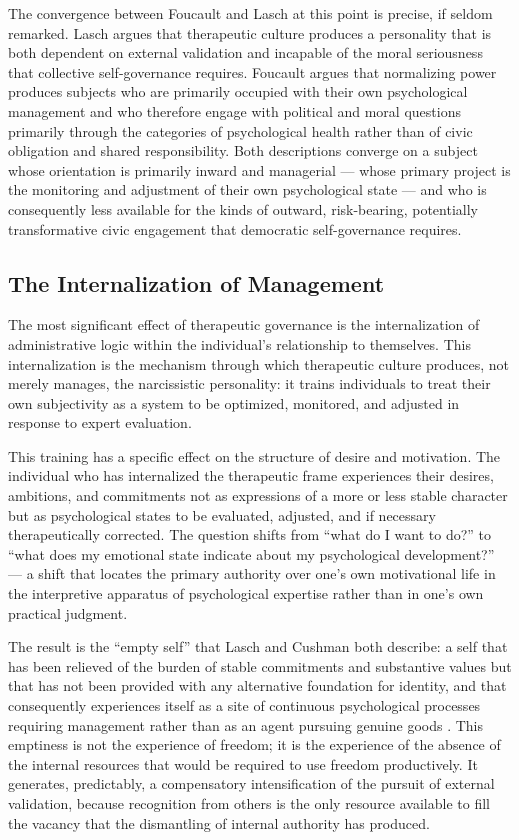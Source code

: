 \documentclass[12pt]{memoir}
\begin{document}
The convergence between Foucault and Lasch at this point is precise, if seldom
remarked. Lasch argues that therapeutic culture produces a personality that is both
dependent on external validation and incapable of the moral seriousness that
collective self-governance requires. Foucault argues that normalizing power produces
subjects who are primarily occupied with their own psychological management and who
therefore engage with political and moral questions primarily through the categories
of psychological health rather than of civic obligation and shared responsibility.
Both descriptions converge on a subject whose orientation is primarily inward and
managerial — whose primary project is the monitoring and adjustment of their own
psychological state — and who is consequently less available for the kinds of
outward, risk-bearing, potentially transformative civic engagement that democratic
self-governance requires.

\subsection{The Internalization of Management}

The most significant effect of therapeutic governance is the internalization of
administrative logic within the individual's relationship to themselves. This
internalization is the mechanism through which therapeutic culture produces, not
merely manages, the narcissistic personality: it trains individuals to treat their
own subjectivity as a system to be optimized, monitored, and adjusted in response
to expert evaluation.

This training has a specific effect on the structure of desire and motivation. The
individual who has internalized the therapeutic frame experiences their desires,
ambitions, and commitments not as expressions of a more or less stable character
but as psychological states to be evaluated, adjusted, and if necessary therapeutically
corrected. The question shifts from \enquote{what do I want to do?} to \enquote{what
does my emotional state indicate about my psychological development?} — a shift that
locates the primary authority over one's own motivational life in the interpretive
apparatus of psychological expertise rather than in one's own practical judgment.

The result is the \enquote{empty self} that Lasch and Cushman both describe: a self
that has been relieved of the burden of stable commitments and substantive values
but that has not been provided with any alternative foundation for identity, and that
consequently experiences itself as a site of continuous psychological processes
requiring management rather than as an agent pursuing genuine goods \citep{cushman1995constructing}.
This emptiness is not the experience of freedom; it is the experience of the absence
of the internal resources that would be required to use freedom productively. It
generates, predictably, a compensatory intensification of the pursuit of external
validation, because recognition from others is the only resource available to fill
the vacancy that the dismantling of internal authority has produced.
\end{document}
